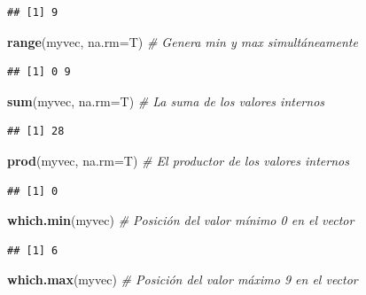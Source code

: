 \documentclass[10pt,]{krantz}
\makeatletter
\newenvironment{Shaded}{\begin{snugshade}}{\end{snugshade}}
\newcommand{\KeywordTok}[1]{\textcolor[rgb]{0.13,0.29,0.53}{\textbf{{#1}}}}
\newcommand{\DataTypeTok}[1]{\textcolor[rgb]{0.13,0.29,0.53}{{#1}}}
\newcommand{\CommentTok}[1]{\textcolor[rgb]{0.56,0.35,0.01}{\textit{{#1}}}}
\newcommand{\NormalTok}[1]{{#1}}
\newenvironment{kframe}{%
\medskip{}
\setlength{\fboxsep}{.8em}
 \def\at@end@of@kframe{}%
 \ifinner\ifhmode%
  \def\at@end@of@kframe{\end{minipage}}%
  \begin{minipage}{\columnwidth}%
 \fi\fi%
 \def\FrameCommand##1{\hskip\@totalleftmargin \hskip-\fboxsep
 \colorbox{shadecolor}{##1}\hskip-\fboxsep
     \hskip-\linewidth \hskip-\@totalleftmargin \hskip\columnwidth}%
 \MakeFramed {\advance\hsize-\width
   \@totalleftmargin\z@ \linewidth\hsize
   \@setminipage}}%
 {\par\unskip\endMakeFramed%
 \at@end@of@kframe}
\renewenvironment{Shaded}{\begin{kframe}}{\end{kframe}}
\makeatother
\begin{document}
\begin{verbatim}
## [1] 9
\end{verbatim}

\begin{Shaded}
\begin{Highlighting}[]
\KeywordTok{range}\NormalTok{(myvec, }\DataTypeTok{na.rm=}\NormalTok{T)  }\CommentTok{# Genera min y max simultáneamente}
\end{Highlighting}
\end{Shaded}

\begin{verbatim}
## [1] 0 9
\end{verbatim}

\begin{Shaded}
\begin{Highlighting}[]
\KeywordTok{sum}\NormalTok{(myvec, }\DataTypeTok{na.rm=}\NormalTok{T)  }\CommentTok{# La suma de los valores internos}
\end{Highlighting}
\end{Shaded}

\begin{verbatim}
## [1] 28
\end{verbatim}

\begin{Shaded}
\begin{Highlighting}[]
\KeywordTok{prod}\NormalTok{(myvec, }\DataTypeTok{na.rm=}\NormalTok{T)  }\CommentTok{# El productor de los valores internos}
\end{Highlighting}
\end{Shaded}

\begin{verbatim}
## [1] 0
\end{verbatim}

\begin{Shaded}
\begin{Highlighting}[]
\KeywordTok{which.min}\NormalTok{(myvec)  }\CommentTok{# Posición del valor mínimo 0 en el vector}
\end{Highlighting}
\end{Shaded}

\begin{verbatim}
## [1] 6
\end{verbatim}

\begin{Shaded}
\begin{Highlighting}[]
\KeywordTok{which.max}\NormalTok{(myvec)  }\CommentTok{# Posición del valor máximo 9 en el vector}
\end{Highlighting}
\end{Shaded}
\end{document}
